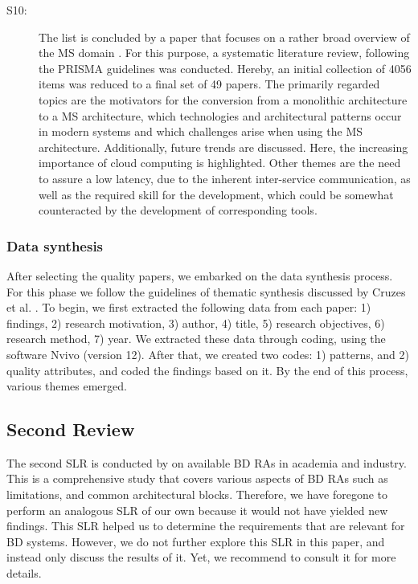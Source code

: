 \documentclass{bmcart}
\begin{document}
\begin{description}
  \item[S10:] The list is concluded by a paper that focuses on a rather broad overview of the MS domain \cite{Weerasinghe.2022}. For this purpose, a systematic literature review, following the PRISMA guidelines \cite{Page.2021} was conducted. Hereby, an initial collection of 4056 items was reduced to a final set of 49 papers. The primarily regarded topics are the motivators for the conversion from a monolithic architecture to a MS architecture, which technologies and architectural patterns occur in modern systems and which challenges arise when using the MS architecture. Additionally, future trends are discussed. Here, the increasing importance of cloud computing is highlighted. Other themes are the need to assure a low latency, due to the inherent inter-service communication, as well as the required skill for the development, which could be somewhat counteracted by the development of corresponding tools.
\end{description}





\subsubsection{Data synthesis}

After selecting the quality papers, we embarked on the data synthesis process. For this phase we follow the guidelines of thematic synthesis discussed by Cruzes et al. \cite{Cruzes.2011}. To begin, we first extracted the following data from each paper: 1) findings, 2) research motivation, 3) author, 4) title, 5) research objectives, 6) research method, 7) year. We extracted these data through coding, using the software Nvivo (version 12). After that, we created two codes: 1) patterns, and 2) quality attributes, and coded the findings based on it. By the end of this process, various themes emerged.



 



\subsection{Second Review} \label{secondReview}

The second SLR is conducted by \cite{ataei2022state} on available BD RAs in academia and industry. This is a comprehensive study that covers various aspects of BD RAs such as limitations, and common architectural blocks. Therefore, we have foregone to perform an analogous SLR of our own because it would not have yielded new findings.  This SLR helped us to determine the requirements that are relevant for BD systems. However, we do not further explore this SLR in this paper, and instead only discuss the results of it. Yet, we recommend to consult it for more details.
\end{document}

